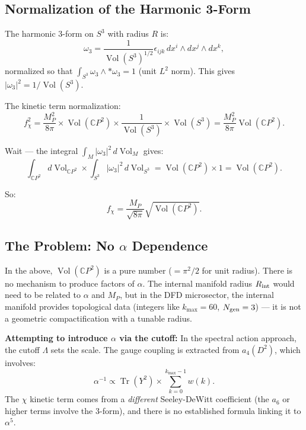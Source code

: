\documentclass[11pt]{article}
\theoremstyle{definition}
\theoremstyle{remark}
\newcommand{\CP}{\mathbb{C}P}
\newcommand{\Tr}{\operatorname{Tr}}
\newcommand{\Vol}{\operatorname{Vol}}
\begin{document}
\subsection{Normalization of the Harmonic 3-Form}

The harmonic 3-form on $S^3$ with radius $R$ is:
\begin{equation}
\omega_3 = \frac{1}{\Vol(S^3)^{1/2}} \epsilon_{ijk}\, dx^i \wedge dx^j \wedge dx^k,
\end{equation}
normalized so that $\int_{S^3} \omega_3 \wedge *\omega_3 = 1$ (unit $L^2$ norm).
This gives $|\omega_3|^2 = 1/\Vol(S^3)$.

The kinetic term normalization:
\begin{equation}
f_\chi^2 = \frac{M_P^2}{8\pi} \times \Vol(\CP^2) \times \frac{1}{\Vol(S^3)} \times \Vol(S^3) = \frac{M_P^2}{8\pi} \Vol(\CP^2).
\end{equation}

Wait --- the integral $\int_M |\omega_3|^2\, d\Vol_M$ gives:
\begin{equation}
\int_{\CP^2} d\Vol_{\CP^2} \times \int_{S^3} |\omega_3|^2\, d\Vol_{S^3} = \Vol(\CP^2) \times 1 = \Vol(\CP^2).
\end{equation}

So:
\begin{equation}
f_\chi = \frac{M_P}{\sqrt{8\pi}} \sqrt{\Vol(\CP^2)}.
\end{equation}

\subsection{The Problem: No $\alpha$ Dependence}

In the above, $\Vol(\CP^2)$ is a pure number ($= \pi^2/2$ for unit radius).
There is no mechanism to produce factors of $\alpha$. The internal manifold
radius $R_{\rm int}$ would need to be related to $\alpha$ and $M_P$, but in the
DFD microsector, the internal manifold provides topological data (integers like
$k_{\max} = 60$, $N_{\rm gen} = 3$) --- it is not a geometric compactification
with a tunable radius.

\textbf{Attempting to introduce $\alpha$ via the cutoff:}
In the spectral action approach, the cutoff $\Lambda$ sets the scale.
The gauge coupling is extracted from $a_4(D^2)$, which involves:
\begin{equation}
\alpha^{-1} \propto \Tr(Y^2) \times \sum_{k=0}^{k_{\max}-1} w(k).
\end{equation}
The $\chi$ kinetic term comes from a \textit{different} Seeley-DeWitt coefficient
(the $a_6$ or higher terms involve the 3-form), and there is no established
formula linking it to $\alpha^5$.
\end{document}
